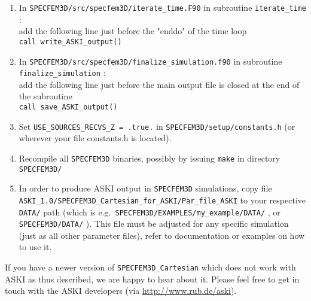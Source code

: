 \documentclass[12pt,a4paper]{article}
\newcommand{\lcode}[1]{\nolinkurl{#1}}
\newcommand{\ASKI}{ {\ttfamily ASKI} }
\begin{document}
\begin{enumerate}
\item In \lcode{SPECFEM3D/src/specfem3D/iterate_time.F90} in subroutine \lcode{iterate_time} :\\
   add the following line just before the "enddo" of the time loop\\
   \lcode{call write_ASKI_output()}

\item In \lcode{SPECFEM3D/src/specfem3D/finalize_simulation.f90} in subroutine \lcode{finalize_simulation} :\\
   add the following line just before the main output file is closed at the end of the subroutine\\
   \lcode{call save_ASKI_output()}

\item Set \lcode{USE_SOURCES_RECVS_Z = .true.} in \lcode{SPECFEM3D/setup/constants.h} (or wherever 
   your file constants.h is located).

\item Recompile all \lcode{SPECFEM3D} binaries, possibly by issuing \lcode{make} in directory \lcode{SPECFEM3D/}

\item In order to produce \ASKI output in \lcode{SPECFEM3D} simulations, copy file 
    \lcode{ASKI_1.0/SPECFEM3D_Cartesian_for_ASKI/Par_file_ASKI} to your respective \lcode{DATA/} path
    (which is e.g.\ \lcode{SPECFEM3D/EXAMPLES/my_example/DATA/} , or \lcode{SPECFEM3D/DATA/} ). This 
    file must be adjusted for any specific simulation (just as all other parameter files), 
    refer to documentation or examples on how to use it.

\end{enumerate}

If you have a newer version of \lcode{SPECFEM3D_Cartesian} which does not work with \ASKI as thus described, we
are happy to hear about it. Please feel free to get in touch with the \ASKI developers (via
\url{http://www.rub.de/aski}). 

%
\end{document}
